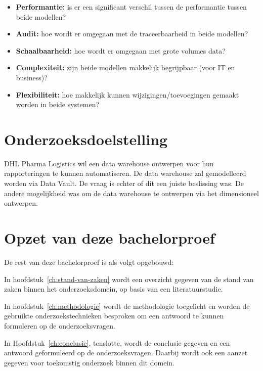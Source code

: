 \begin{itemize}
	\item \textbf{Performantie:} is er een significant verschil tussen de performantie tussen beide modellen?
	\item \textbf{Audit:} hoe wordt er omgegaan met de traceerbaarheid in beide modellen?
	\item \textbf{Schaalbaarheid:} hoe wordt er omgegaan met grote volumes data?
	\item \textbf{Complexiteit:} zijn beide modellen makkelijk begrijpbaar (voor IT en business)?
	\item \textbf{Flexibiliteit:} hoe makkelijk kunnen wijzigingen/toevoegingen gemaakt worden in beide systemen?
	
\end{itemize}

\section{Onderzoeksdoelstelling}
\label{sec:onderzoeksdoelstelling}
DHL Pharma Logistics wil een data warehouse ontwerpen voor hun rapporteringen te kunnen automatiseren. De data warehouse zal gemodelleerd worden via Data Vault. De vraag is echter of dit een juiste beslissing was. De andere mogelijkheid was om de data warehouse te ontwerpen via het dimensioneel ontwerpen. 

\section{Opzet van deze bachelorproef}
\label{sec:opzet-bachelorproef}


De rest van deze bachelorproef is als volgt opgebouwd:

In hoofdstuk~\ref{ch:stand-van-zaken} wordt een overzicht gegeven van de stand van zaken binnen het onderzoeksdomein, op basis van een literatuurstudie.

In hoofdstuk~\ref{ch:methodologie} wordt de methodologie toegelicht en worden de gebruikte onderzoekstechnieken besproken om een antwoord te kunnen formuleren op de onderzoeksvragen.


In Hoofdstuk~\ref{ch:conclusie}, tenslotte, wordt de conclusie gegeven en een antwoord geformuleerd op de onderzoeksvragen. Daarbij wordt ook een aanzet gegeven voor toekomstig onderzoek binnen dit domein.


